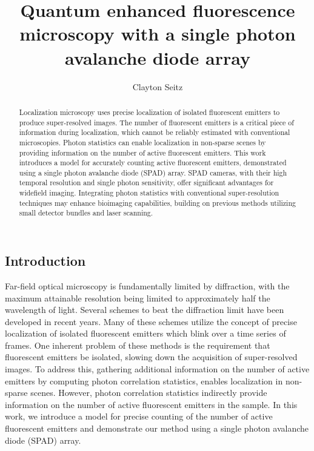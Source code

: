 \documentclass[a4paper, twocolumn, superscriptaddress,prl]{revtex4}  %
\begin{document}
\title{Quantum enhanced fluorescence microscopy with a single photon avalanche diode array}
\author{Clayton Seitz}

\begin{abstract}
Localization microscopy uses precise localization of isolated fluorescent emitters to produce super-resolved images. The number of fluorescent emitters is a critical piece of information during localization, which cannot be reliably estimated with conventional microscopies. Photon statistics can enable localization in non-sparse scenes by providing information on the number of active fluorescent emitters. This work introduces a model for accurately counting active fluorescent emitters, demonstrated using a single photon avalanche diode (SPAD) array. SPAD cameras, with their high temporal resolution and single photon sensitivity, offer significant advantages for widefield imaging. Integrating photon statistics with conventional super-resolution techniques may enhance bioimaging capabilities, building on previous methods utilizing small detector bundles and laser scanning.
\end{abstract}

\maketitle 

\subsection{Introduction}

Far-field optical microscopy is fundamentally limited by diffraction, with the maximum attainable resolution being limited to approximately half the wavelength of light. Several schemes to beat the diffraction limit have been developed in recent years. Many of these schemes utilize the concept of precise localization of isolated fluorescent emitters which blink over a time series of frames. One inherent problem of these methods is the requirement that fluorescent emitters be isolated, slowing down the acquisition of super-resolved images. To address this, gathering additional information on the number of active emitters by computing photon correlation statistics, enables localization in non-sparse scenes. However, photon correlation statistics indirectly provide information on the number of active fluorescent emitters in the sample. In this work, we introduce a model for precise counting of the number of active fluorescent emitters and demonstrate our method using a single photon avalanche diode (SPAD) array. 
\end{document}
